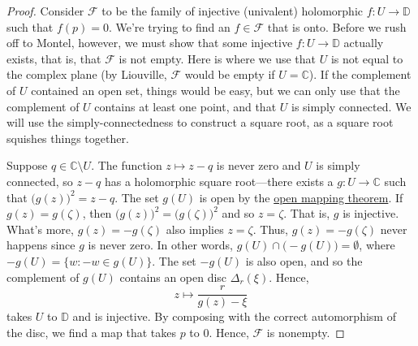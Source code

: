 \documentclass[12pt,openany]{book}
\newcommand{\C}{{\mathbb{C}}}
\newcommand{\D}{{\mathbb{D}}}
\newcommand{\sF}{{\mathscr{F}}}
\theoremstyle{plain}
\theoremstyle{remark}
\theoremstyle{definition}
\theoremstyle{exercise}
\theoremstyle{example}
\begin{document}
\begin{proof}
Consider $\sF$ to be the family of injective (univalent) holomorphic
$f \colon U \to \D$ such that $f(p) = 0$.  We're trying to find
an $f \in \sF$ that is onto.
Before we rush off to Montel, however, we must show that some
injective
$f \colon U \to \D$ actually exists,
that is, that $\sF$ is not empty.  Here is where we
use that $U$ is not equal to the complex plane (by Liouville, $\sF$
would be empty if $U = \C$).  If the complement of $U$ contained an open
set, things would be easy, but we can only use that the complement of $U$
contains at least one point, and that $U$ is simply connected.  We will use
the simply-connectedness to construct a square root, as a square root squishes
things together.

Suppose $q \in \C \setminus U$.  The function $z \mapsto z-q$ is never
zero and $U$ is simply connected, so $z-q$ has a holomorphic square
root---there exists a $g \colon U \to \C$ such that
${\bigl(g(z)\bigr)}^2 = z-q$.
The set $g(U)$ is open by the \hyperref[thm:OMT]{open mapping theorem}.
If $g(z)=g(\zeta)$, then ${\bigl(g(z)\bigr)}^2={\bigl(g(\zeta)\bigr)}^2$ and so
$z=\zeta$.  That is, $g$ is injective.  What's more,
$g(z)=-g(\zeta)$ also implies $z=\zeta$.  Thus, $g(z) =
-g(\zeta)$ never happens since $g$ is never zero.
In other words, $g(U) \cap \bigl( - g(U) \bigr) = \emptyset$,
where
$- g(U) = \{ w : -w \in g(U) \}$.
The set
$- g(U)$ is also open, and so
the complement of $g(U)$ contains an open disc $\Delta_r(\xi)$.  Hence,
\begin{equation*}
z \mapsto \frac{r}{g(z)-\xi}
\end{equation*}
takes $U$ to $\D$ and is injective.
By composing with the correct automorphism of the disc,
we find a map that takes $p$ to $0$.  Hence, $\sF$ is nonempty.


\end{proof}
\end{document}
